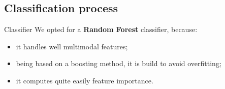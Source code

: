\documentclass[export]{beamer}
\begin{document}
        \subsection{Classification process}
            \begin{frame}{Classifier}
                We opted for a \textbf{Random Forest} classifier, because:
                \begin{itemize}[label=$\blacktriangleright$, font=\color{IGNGreen}]
                    \item<1-> it handles well multimodal features;
                    \item<2-> being based on a boosting method, it is build to avoid overfitting;
                    \item<3-> it computes quite easily feature importance.
                \end{itemize}
            \end{frame}
\end{document}

